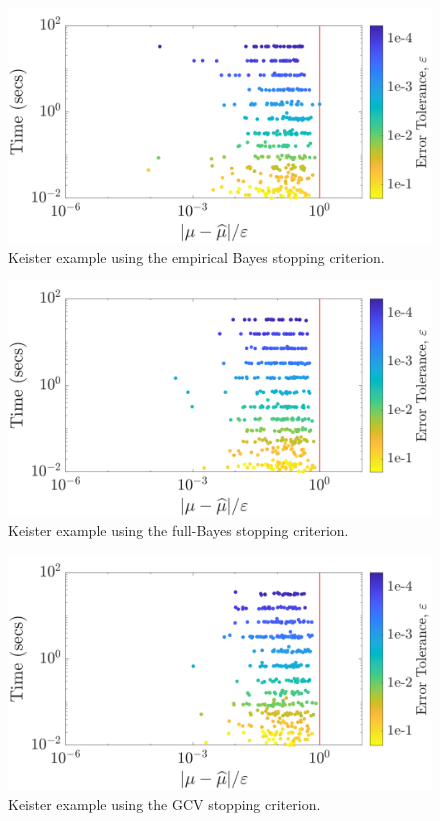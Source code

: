 \documentclass[graybox,footinfo]{svmult}
\begin{document}
\begin{figure}
\centering
\includegraphics[width=0.95\linewidth]{"figures/Sobol/Sobol_Keister_guaranteed_time_MLE__d4_r1_2019-Sep-1"}
\caption[Sobol: Keister guaranteed: MLE]{Keister example using the empirical Bayes stopping criterion.}
\label{FJ:fig:Sobol-keister-guaranteed-MLE}
\end{figure}
\begin{figure}
\centering
\includegraphics[width=0.95\linewidth]{"figures/Sobol/Sobol_Keister_guaranteed_time_full__d4_r1_2019-Sep-1"}
\caption[Sobol: Keister guaranteed: Full Bayes]{Keister example using the full-Bayes stopping criterion.}
\label{FJ:fig:Sobol-keister-guaranteed-FB}
\end{figure}
\begin{figure}
\centering
\includegraphics[width=0.95\linewidth]{"figures/Sobol/Sobol_Keister_guaranteed_time_GCV__d4_r1_2019-Sep-1"}
\caption[Sobol: Keister guaranteed: GCV]{Keister example using the GCV stopping criterion.}
\label{FJ:fig:Sobol-keister-guaranteed-GCV}
\end{figure}
\end{document}
